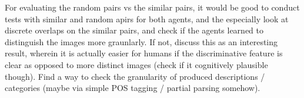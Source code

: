 For evaluating the random pairs vs the similar pairs, it would be good to conduct tests with similar and random apirs for both agents, and the especially look at discrete overlaps on the similar pairs, and check if the agents learned to distinguish the images more graunlarly. If not, discuss this as an interesting result, wherein it is actually easier for humans if the discriminative feature is clear as opposed to more distinct images (check if it cognitively plausible though). Find a way to check the granularity of produced descriptions / categories (maybe via simple POS tagging / partial parsing somehow).



